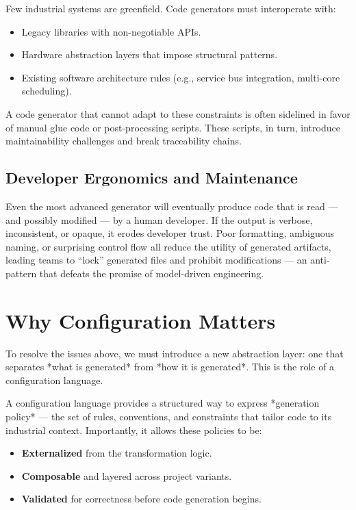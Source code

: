 Few industrial systems are greenfield. Code generators must interoperate with:

\begin{itemize}
	\item Legacy libraries with non-negotiable APIs.
	\item Hardware abstraction layers that impose structural patterns.
	\item Existing software architecture rules (e.g., service bus integration, multi-core scheduling).
\end{itemize}

A code generator that cannot adapt to these constraints is often sidelined in favor of manual glue code or post-processing scripts. These scripts, in turn, introduce maintainability challenges and break traceability chains.

\subsection*{Developer Ergonomics and Maintenance}

Even the most advanced generator will eventually produce code that is read — and possibly modified — by a human developer. If the output is verbose, inconsistent, or opaque, it erodes developer trust. Poor formatting, ambiguous naming, or surprising control flow all reduce the utility of generated artifacts, leading teams to “lock” generated files and prohibit modifications — an anti-pattern that defeats the promise of model-driven engineering.

\section{Why Configuration Matters}
\label{sec:why_configuration_matters}

To resolve the issues above, we must introduce a new abstraction layer: one that separates *what is generated* from *how it is generated*. This is the role of a configuration language.

A configuration language provides a structured way to express *generation policy* — the set of rules, conventions, and constraints that tailor code to its industrial context. Importantly, it allows these policies to be:

\begin{itemize}
	\item \textbf{Externalized} from the transformation logic.
	\item \textbf{Composable} and layered across project variants.
	\item \textbf{Validated} for correctness before code generation begins.
\end{itemize}

